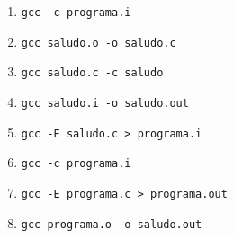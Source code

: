 \begin{enumerate}
  \item \texttt{gcc -c programa.i}
  \item \texttt{gcc saludo.o -o saludo.c}
  \item \texttt{gcc saludo.c -c saludo}
  \item \texttt{gcc saludo.i -o saludo.out}
  \item \texttt{gcc -E saludo.c > programa.i}
  \item \texttt{gcc -c programa.i}
  \item \texttt{gcc -E programa.c > programa.out}
  \item \texttt{gcc programa.o -o saludo.out}
\end{enumerate}

